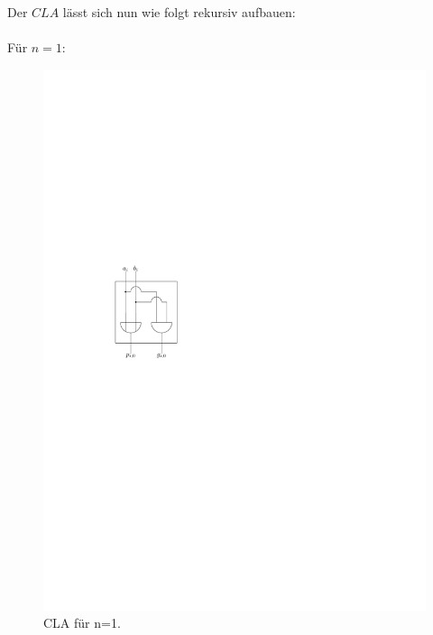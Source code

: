 \pagebreak
\noindent Der $CLA$ l\"{a}sst sich nun wie folgt rekursiv aufbauen:
\\\\Für $n = 1$:
\begin{figure}[h]
\centering
\includegraphics[scale=1.0]{bilder/CLA_1.pdf}
\caption{CLA für n=1.}
\end{figure}

